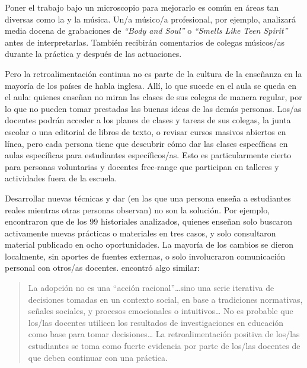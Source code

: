 Poner el trabajo bajo un microscopio para mejorarlo es común
en áreas tan diversas como la  y la música.
Un/a músico/a profesional,
por ejemplo,
analizará media docena de grabaciones de \emph{``Body and Soul''} o \emph{``Smells Like Teen Spirit''} antes de interpretarlas.
También recibirán comentarios de colegas músicos/as durante la práctica y después de las actuaciones.

Pero la retroalimentación continua no es parte de la cultura de la enseñanza en la mayoría de los países de habla inglesa.
Allí,
lo que sucede en el aula se queda en el aula:
quienes enseñan no miran las clases de sus colegas de manera regular,
por lo que no pueden tomar prestadas las buenas ideas de las demás personas.
Los/as docentes podrán acceder a los planes de clases y tareas de sus colegas,
la junta escolar o una editorial de libros de texto,
o revisar cursos masivos abiertos en línea,
pero cada persona tiene que descubrir
cómo dar las clases específicas en aulas específicas para estudiantes específicos/as.
Esto es particularmente cierto para personas voluntarias y docentes free-range
que participan en talleres y actividades fuera de la escuela.

Desarrollar nuevas técnicas
y dar 
(en las que una persona enseña a estudiantes reales mientras otras personas observan)
no son la solución.
Por ejemplo,
\cite{Finc2007,Finc2012} encontraron que de los 99 historiales analizados,
quienes enseñan solo buscaron activamente nuevas prácticas o materiales en tres casos,
y solo consultaron material publicado en ocho oportunidades.
La mayoría de los cambios se dieron localmente,
sin aportes de fuentes externas,
o solo involucraron comunicación personal con otros/as docentes.
\cite{Bark2015} encontró algo similar:

\begin{quote}

  La adopción no es una ``acción racional''{\ldots}sino
  una serie iterativa de decisiones tomadas en un contexto social,
  en base a tradiciones normativas, señales sociales,
  y procesos emocionales o intuitivos{\ldots}
  No es probable que los/las docentes utilicen los resultados de investigaciones en educación
  como base para tomar decisiones{\ldots}
  La retroalimentación positiva de los/las estudiantes se toma como fuerte evidencia por parte de los/las docentes
  de que deben continuar con una práctica.

\end{quote}

